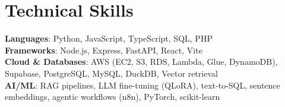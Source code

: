 \documentclass[letterpaper,11pt]{article}
\begin{document}
\section{Technical Skills}
 \begin{itemize}[leftmargin=0.15in, label={}]
    \small{\item{
     \textbf{Languages}{: Python, JavaScript, TypeScript, SQL, PHP} \\
     \textbf{Frameworks}{: Node.js, Express, FastAPI, React, Vite} \\
     \textbf{Cloud \& Databases}{: AWS (EC2, S3, RDS, Lambda, Glue, DynamoDB), Supabase, PostgreSQL, MySQL, DuckDB, Vector retrieval} \\
     \textbf{AI/ML}{: RAG pipelines, LLM fine-tuning (QLoRA), text-to-SQL, sentence embeddings, agentic workflows (n8n), PyTorch, scikit-learn}
    }}
 \end{itemize}

\end{document}
